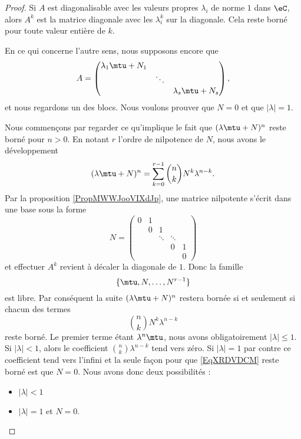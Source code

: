 \begin{proof}
    Si \( A\) est diagonalisable avec les valeurs propres \( \lambda_i\) de norme \( 1\) dans \( \eC\), alors \( A^k\) est la matrice diagonale avec les \( \lambda_i^k\) sur la diagonale. Cela reste borné pour toute valeur entière de \( k\).

    En ce qui concerne l'autre sens, nous supposons encore que
    \begin{equation}
        A=\begin{pmatrix}
            \lambda_1\mtu+N_1    &       &       \\
                &   \ddots    &       \\
                &       &   \lambda_s\mtu+N_s
        \end{pmatrix},
    \end{equation}
    et nous regardons un des blocs. Nous voulons prouver que \( N=0\) et que \( | \lambda |=1\).
    
    Nous commençons par regarder ce qu'implique le fait que \( (\lambda \mtu+N)^n\) reste borné pour \( n>0\). En notant \( r\) l'ordre de nilpotence de \( N\), nous avons le développement
    \begin{equation}
        (\lambda\mtu+N)^n=\sum_{k=0}^{r-1}\binom{ n }{ k }N^k\lambda^{n-k}.
    \end{equation}
    Par la proposition \ref{PropMWWJooVIXdJp}, une matrice nilpotente s'écrit dans une base sous la forme
    \begin{equation}
        N=\begin{pmatrix}
             0   &   1    &       &       \\
                &   0    &   1    &       \\
                & &   \ddots   &   \ddots    &      \\ 
                &&       &   0    &   1     \\
                &&       &      &   0     
         \end{pmatrix}
    \end{equation}
    et effectuer \( A^k\) revient à décaler la diagonale de \( 1\). Donc la famille
    \begin{equation}
        \{ \mtu,N,\ldots, N^{r-1} \}
    \end{equation}
    est libre. Par conséquent la suite \( (\lambda\mtu+N)^n\) restera bornée si et seulement si chacun des termes 
    \begin{equation}    \label{EqXRDVDCM}
        \binom{ n }{ k }N^k\lambda^{n-k}
    \end{equation}
    reste borné. Le premier terme étant \( \lambda^n\mtu\), nous avons obligatoirement \( | \lambda |\leq 1\). Si \( | \lambda |<1\), alors le coefficient \( \binom{ n }{ k }\lambda^{n-k}\) tend vers zéro. Si \( | \lambda |=1\) par contre ce coefficient tend vers l'infini et la seule façon pour que \eqref{EqXRDVDCM} reste borné est que \( N=0\). Nous avons donc deux possibilités :
    \begin{itemize}
        \item \( | \lambda |<1\)
        \item \( | \lambda |=1\) et \( N=0\).
    \end{itemize}


\end{proof}
